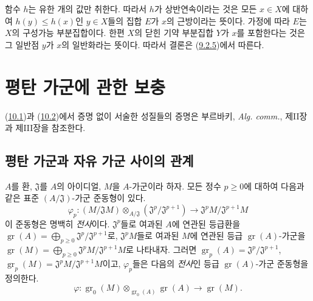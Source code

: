 함수 $h$는 유한 개의 값만 취한다. 따라서 $h$가 상반연속이라는 것은
모든 $x\in X$에 대하여 $h(y)\leq h(x)$인 $y\in X$들의 집합 $E$가
$x$의 근방이라는 뜻이다. 가정에 따라 $E$는 $X$의 구성가능
부분집합이다. 한편 $X$의 닫힌 기약 부분집합 $Y$가 $x$를 포함한다는
것은 그 일반점 $y$가 $x$의 일반화라는 뜻이다. 따라서 결론은
(\hyperref[0.9.2.5-ko]{9.2.5})에서 따른다.

\section{평탄 가군에 관한 보충}
\label{section:0.10-fr}

(\hyperref[subsection:0.10.1-fr]{10.1})과
(\hyperref[subsection:0.10.2-fr]{10.2})에서 증명 없이 서술한 성질들의
증명은 부르바키, \emph{Alg. comm.}, 제II장과 제III장을 참조한다.

\subsection{평탄 가군과 자유 가군 사이의 관계}
\label{subsection:0.10.1-fr}

\begin{env}[10.1.1]
\label{0.10.1.1-fr}
$A$를 환, $\mathfrak{J}$를 $A$의 아이디얼, $M$을 $A$-가군이라 하자. 모든
정수 $p\geq0$에 대하여 다음과 같은 표준 $(A/\mathfrak{J})$-가군
준동형이 있다.
\[
\label{0.10.1.1.1-fr}
  \varphi_p:(M/\mathfrak{J}M)\otimes_{A/\mathfrak{J}}
  (\mathfrak{J}^p/\mathfrak{J}^{p+1})
  \longrightarrow \mathfrak{J}^pM/\mathfrak{J}^{p+1}M
  \tag{10.1.1.1}
\]
이 준동형은 명백히 \emph{전사}이다. $\mathfrak{J}^p$들로 여과된 $A$에
연관된 등급환을
$\operatorname{gr}(A)=\bigoplus_{p\geq0}\mathfrak{J}^p/\mathfrak{J}^{p+1}$로,
$\mathfrak{J}^pM$들로 여과된 $M$에 연관된 등급 $\operatorname{gr}(A)$-가군을
$\operatorname{gr}(M)=\bigoplus_{p\geq0}\mathfrak{J}^pM/\mathfrak{J}^{p+1}M$로
나타내자. 그러면
$\operatorname{gr}_p(A)=\mathfrak{J}^p/\mathfrak{J}^{p+1}$,
$\operatorname{gr}_p(M)=\mathfrak{J}^pM/\mathfrak{J}^{p+1}M$이고,
$\varphi_p$들은 다음의 \emph{전사}인 등급 $\operatorname{gr}(A)$-가군
준동형을 정의한다.
\[
\label{0.10.1.1.2-fr}
  \varphi:\operatorname{gr}_0(M)\otimes_{\operatorname{gr}_0(A)}
  \operatorname{gr}(A)\longrightarrow\operatorname{gr}(M).
  \tag{10.1.1.2}
\]
\end{env}

